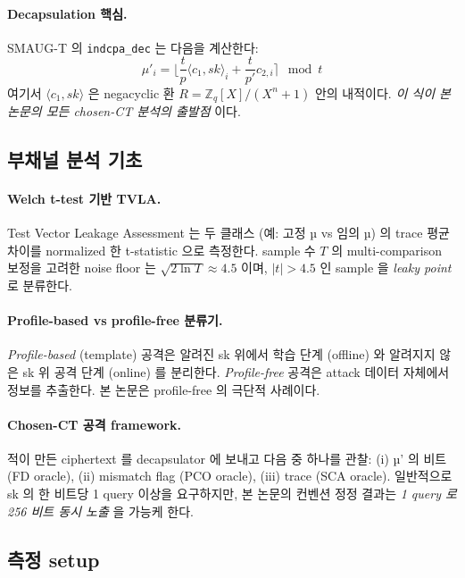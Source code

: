 \documentclass[11pt]{article}
\theoremstyle{plain}
\theoremstyle{definition}
\theoremstyle{remark}
\newcommand{\Zq}{\mathbb{Z}_q}
\newcommand{\round}[1]{\lfloor #1 \rceil}
\begin{document}
\paragraph{Decapsulation 핵심.}
SMAUG-T 의 \texttt{indcpa\_dec} 는 다음을 계산한다:
\begin{equation}
\mu'_i = \round{\frac{t}{p}\langle c_1, sk \rangle_i + \frac{t}{p'} c_{2,i}} \mod t
\label{eq:dec}
\end{equation}
여기서 $\langle c_1, sk \rangle$ 은 negacyclic 환 $R = \Zq[X]/(X^n+1)$
안의 내적이다. \emph{이 식이 본 논문의 모든 chosen-CT 분석의 출발점} 이다.

\subsection{부채널 분석 기초}

\paragraph{Welch t-test 기반 TVLA.}
Test Vector Leakage Assessment 는 두 클래스 (예: 고정 µ vs 임의 µ) 의
trace 평균 차이를 normalized 한 t-statistic 으로 측정한다.
sample 수 $T$ 의 multi-comparison 보정을 고려한 noise floor 는
$\sqrt{2 \ln T} \approx 4.5$ 이며, $|t| > 4.5$ 인 sample 을 \emph{leaky point}
로 분류한다.

\paragraph{Profile-based vs profile-free 분류기.}
\emph{Profile-based} (template) 공격은 알려진 sk 위에서 학습 단계 (offline)
와 알려지지 않은 sk 위 공격 단계 (online) 를 분리한다. \emph{Profile-free}
공격은 attack 데이터 자체에서 정보를 추출한다. 본 논문은 profile-free 의
극단적 사례이다.

\paragraph{Chosen-CT 공격 framework.}
적이 만든 ciphertext 를 decapsulator 에 보내고 다음 중 하나를 관찰:
(i) µ' 의 비트 (FD oracle), (ii) mismatch flag (PCO oracle), (iii) trace
(SCA oracle). 일반적으로 sk 의 한 비트당 1 query 이상을 요구하지만, 본 논문의
컨벤션 정정 결과는 \emph{1 query 로 256 비트 동시 노출} 을 가능케 한다.

\subsection{측정 setup}
\end{document}

